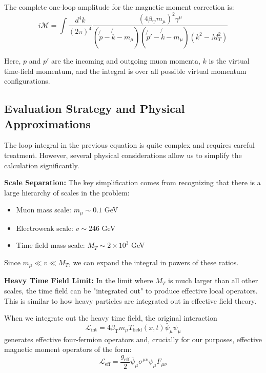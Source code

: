 \documentclass[12pt,a4paper]{article}
\newcommand{\Tfield}{T_{\text{field}}(x,t)}
\newcommand{\betaT}{\beta_{\text{T}}}
\begin{document}
	The complete one-loop amplitude for the magnetic moment correction is:
	\begin{equation}
		i\mathcal{M} = \int \frac{d^4k}{(2\pi)^4} \frac{(4\betaT m_\mu)^2 \gamma^\mu}{(\not{p} - \not{k} - m_\mu)(\not{p}' - \not{k} - m_\mu)(k^2 - M_T^2)}
	\end{equation}
	
	Here, $p$ and $p'$ are the incoming and outgoing muon momenta, $k$ is the virtual time-field momentum, and the integral is over all possible virtual momentum configurations.
	
	\subsection{Evaluation Strategy and Physical Approximations}
	
	The loop integral in the previous equation is quite complex and requires careful treatment. However, several physical considerations allow us to simplify the calculation significantly.
	
	\textbf{Scale Separation:} The key simplification comes from recognizing that there is a large hierarchy of scales in the problem:
	\begin{itemize}
		\item Muon mass scale: $m_\mu \sim 0.1$ GeV
		\item Electroweak scale: $v \sim 246$ GeV  
		\item Time field mass scale: $M_T \sim 2 \times 10^3$ GeV
	\end{itemize}
	
	Since $m_\mu \ll v \ll M_T$, we can expand the integral in powers of these ratios.
	
	\textbf{Heavy Time Field Limit:} In the limit where $M_T$ is much larger than all other scales, the time field can be "integrated out" to produce effective local operators. This is similar to how heavy particles are integrated out in effective field theory.
	
	When we integrate out the heavy time field, the original interaction
	\begin{equation}
		\mathcal{L}_{\text{int}} = 4\betaT m_\mu \Tfield \bar{\psi}_\mu \psi_\mu
	\end{equation}
	generates effective four-fermion operators and, crucially for our purposes, effective magnetic moment operators of the form:
	\begin{equation}
		\mathcal{L}_{\text{eff}} = \frac{g_{\text{eff}}}{2} \bar{\psi}_\mu \sigma^{\mu\nu} \psi_\mu F_{\mu\nu}
	\end{equation}
	
\end{document}
